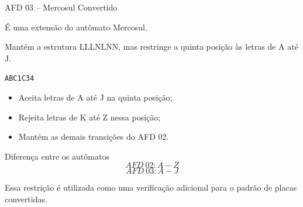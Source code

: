 \documentclass[aspectratio=169,12pt]{beamer}
\begin{document}
\begin{frame}{AFD 03 -- Mercosul Convertido}
    
    \footnotesize
    É uma extensão do autômato Mercosul.

    \vspace{0.2cm}

    Mantém a estrutura LLLNLNN, mas restringe a quinta posição
    às letras de A até J.

    \begin{center}
        \Large
        \texttt{ABC1C34}
    \end{center}

    \begin{itemize}
        \item Aceita letras de A até J na quinta posição;
        \item Rejeita letras de K até Z nessa posição;
        \item Mantém as demais transições do AFD 02.
    \end{itemize}

    \vspace{0.3cm}

    \begin{block}{Diferença entre os autômatos}
        \[
            AFD\ 02: A-Z
        \]
        \[
            AFD\ 03: A-J
        \]
    \end{block}

    Essa restrição é utilizada como uma verificação adicional
    para o padrão de placas convertidas.

\end{frame}

\end{document}
